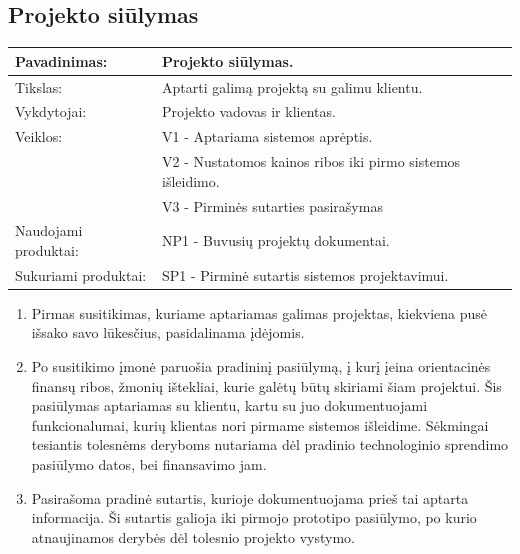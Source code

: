 \documentclass{VUMIFPSkursinis}
\begin{document}
	\subsection{Projekto siūlymas}
	\begin{center}
		\begin{tabular}{ | l | l | } 
		\hline
	Pavadinimas:         & Projekto siūlymas.                                      \\ \hline
	Tikslas: 	           & Aptarti galimą projektą su galimu klientu. 							\\ \hline
	Vykdytojai:          & Projekto vadovas ir klientas.                             \\ \hline
	Veiklos:             & V1 - Aptariama sistemos aprėptis. 													\\
											 & V2 - Nustatomos kainos ribos iki pirmo sistemos išleidimo.  \\
											 & V3 - Pirminės sutarties pasirašymas 													\\ \hline
	Naudojami produktai: & NP1 - Buvusių projektų dokumentai. 													 \\ \hline
	Sukuriami produktai: & SP1 - Pirminė sutartis sistemos projektavimui. 								\\ \hline
\end{tabular}
\end{center}
\begin{enumerate}
	\item Pirmas susitikimas, kuriame aptariamas galimas projektas, kiekviena pusė išsako savo lūkesčius, pasidalinama įdėjomis.
	\item Po susitikimo įmonė paruošia pradininį pasiūlymą, į kurį įeina orientacinės finansų ribos, žmonių ištekliai, kurie galėtų būtų skiriami šiam projektui. Šis pasiūlymas aptariamas su klientu, kartu su juo dokumentuojami funkcionalumai, kurių klientas nori pirmame sistemos išleidime. Sėkmingai tesiantis tolesnėms deryboms nutariama dėl pradinio technologinio sprendimo pasiūlymo datos, bei finansavimo jam.
	\item Pasirašoma pradinė sutartis, kurioje dokumentuojama prieš tai aptarta informacija. Ši sutartis galioja iki pirmojo prototipo pasiūlymo, po kurio atnaujinamos derybės dėl tolesnio projekto vystymo.
\end{enumerate}
\end{document}
